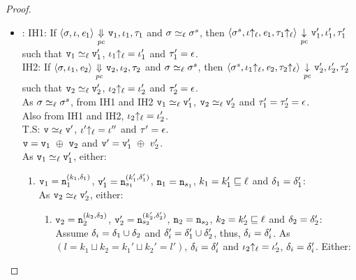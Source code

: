 \begin{proof}
\begin{itemize}[leftmargin=.5in]
  \item{}:
    IH1: If $\langle \sigma, \iota, \mathit{e}_1 \rangle
    {~\underset{\mathit{pc}}{\Downarrow}~} \texttt{v}_1, \iota_1, \tau_1 $ and $\sigma
    \simeq_\ell \sigma^s$, then 
    $\langle \sigma^s, \iota{\uparrow_\ell}, \mathit{e}_1, \tau_1{\uparrow_\ell} \rangle {~\underset{\mathit{pc}}{\downarrow}~} \texttt{v}_1',
    \iota_1', \tau_1' $ such that 
    $\texttt{v}_1 \simeq_\ell \texttt{v}_1'$, $\iota_1{\uparrow_\ell} = \iota_1'$ and $\tau_1' = \epsilon$. \\
    IH2: If $\langle \sigma, \iota_1, \mathit{e}_2 \rangle
    {~\underset{\mathit{pc}}{\Downarrow}~} \texttt{v}_2, \iota_2, \tau_2 $ and $\sigma
    \simeq_\ell \sigma^s$, then 
    $\langle \sigma^s, \iota_1{\uparrow_\ell}, \mathit{e}_2, \tau_2{\uparrow_\ell} \rangle {~\underset{\mathit{pc}}{\downarrow}~} \texttt{v}_2',
    \iota_2', \tau_2' $ such that $\texttt{v}_2 \simeq_\ell \texttt{v}_2'$,
    $\iota_2{\uparrow_\ell} = \iota_2'$
    and $\tau_2' = \epsilon$. \\  
    As $\sigma \simeq_\ell \sigma^s$, from IH1 and IH2 $\texttt{v}_1
    \simeq_\ell \texttt{v}_1'$, $\texttt{v}_2 \simeq_\ell \texttt{v}_2'$ and $\tau_1'
    = \tau_2' = \epsilon$. \\ Also from IH1 and IH2, $\iota_2{\uparrow_\ell} =
    \iota_2'$. \\
    T.S: $\texttt{v} \simeq_\ell \texttt{v}'$, $\iota'{\uparrow_\ell} = \iota''$ and $\tau' = \epsilon$. \\
    $\texttt{v} = \texttt{v}_1 ~\oplus~ \texttt{v}_2$ and $\texttt{v}' = \texttt{v}_1'~\oplus~v_2'$. \\
    As $\texttt{v}_1 \simeq_\ell \texttt{v}_1'$, either:

    \begin{enumerate}
    \item $\texttt{v}_1 = \texttt{n}_1^{(k_1, \delta_1)}$, $\texttt{v}_1' =
      \texttt{n}_{s_1}^{(k_1',\delta_1')}$, $\texttt{n}_1 = \texttt{n}_{s_1}$, $k_1 = k_1'
      \sqsubseteq \ell$ and $\delta_1 = \delta_{1}'$: \\ 
      As $\texttt{v}_2 \simeq_\ell \texttt{v}_2'$, either: 

      \begin{enumerate}
      \item $\texttt{v}_2 = \texttt{n}_2^{(k_2, \delta_2)}$, $\texttt{v}_2' =
        \texttt{n}_{s_2}^{(k_2',\delta_2')}$, $\texttt{n}_2 = \texttt{n}_{s_2}$, $k_2 = k_2'
        \sqsubseteq \ell$ and $\delta_2 = \delta_{2}'$: \\
        Assume $\delta_i = \delta_1 \cup \delta_2$ and $\delta_i' = \delta_1'
        \cup \delta_2'$, thus, $\delta_i = \delta_i'$.  As $(l = k_1 \sqcup
        k_2 = k_1' \sqcup k_2' = l')$, $\delta_i = \delta_i'$ and $\iota_2{\uparrow_\ell}
        = \iota_2'$, $\delta_i = \delta_i'$. Either:


\end{enumerate}
\end{enumerate}
\end{itemize}
\end{proof}

